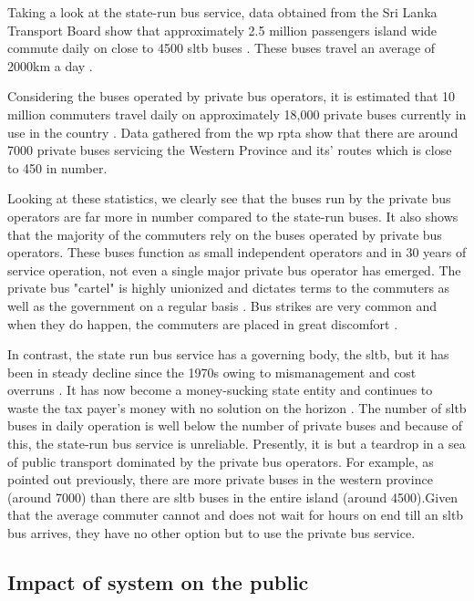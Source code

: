 Taking a look at the state-run bus service, data obtained from the Sri Lanka Transport Board show that approximately 2.5 million passengers island wide commute daily on close to 4500 \acrshort{sltb} buses \cite{SriLankaTransportBoard2010}. These buses travel an average of 2000km a day \cite{SriLankaTransportBoard2012}. 

Considering the buses operated by private bus operators, it is estimated that 10 million commuters travel daily on approximately 18,000 private buses currently in use in the country \cite{Silva2010}. Data gathered from the \acrshort{wp} \acrshort{rpta} show that there are around 7000 private buses servicing the Western Province and its' routes which is close to 450 in number. 

Looking at these statistics, we clearly see that the buses run by the private bus operators are far more in number compared to the state-run buses. It also shows that the majority of the commuters rely on the buses operated by private bus operators. These buses function as small independent operators and in 30 years of service operation, not even a single major private bus operator has emerged. The private bus "cartel" is highly unionized and dictates terms to the commuters as well as the government on a regular basis \cite{AdaDerana2012}. Bus strikes are very common and when they do happen, the commuters are placed in great discomfort \cite{Samarajiva2012, ColomboPage2012}.

In contrast, the state run bus service has a governing body, the \acrshort{sltb}, but it has been in steady decline since the 1970s owing to mismanagement and cost overruns \cite{AnswersDotCom2012}. It has now become a money-sucking state entity and continues to waste the tax payer's money with no solution on the horizon \cite{LBO2011, Sirimanne2013}. The number of \acrshort{sltb} buses in daily operation is well below the number of private buses and because of this, the state-run bus service is unreliable. Presently, it is but a teardrop in a sea of public transport dominated by the private bus operators. For example, as pointed out previously, there are more private buses in the western province (around 7000) than there are \acrshort{sltb} buses in the entire island (around 4500).Given that the average commuter cannot and does not wait for hours on end till an \acrshort{sltb} bus arrives, they have no other option but to use the private bus service. \cite{Wijayapala2012, Azwer2012}

\subsection{Impact of system on the public}

